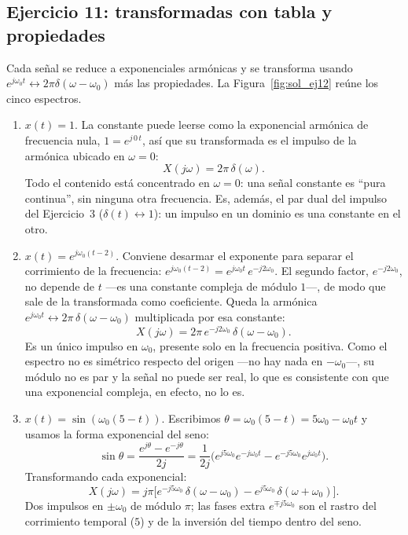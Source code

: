 \documentclass[10pt,a4paper]{article}
\begin{document}
	\subsection*{Ejercicio 11: transformadas con tabla y propiedades}

	Cada señal se reduce a exponenciales armónicas y se transforma usando $e^{j\omega_0 t}\leftrightarrow 2\pi\delta(\omega-\omega_0)$ más las propiedades. La Figura~\ref{fig:sol_ej12} reúne los cinco espectros.

	\begin{enumerate}[label=\textbf{\alph*)}]
		\item $x(t)=1$. La constante puede leerse como la exponencial armónica de frecuencia nula, $1=e^{j\,0\,t}$, así que su transformada es el impulso de la armónica ubicado en $\omega=0$:
		\[
			\boxed{X(j\omega)=2\pi\,\delta(\omega).}
		\]
		Todo el contenido está concentrado en $\omega=0$: una señal constante es ``pura continua'', sin ninguna otra frecuencia. Es, además, el par dual del impulso del Ejercicio~3 ($\delta(t)\leftrightarrow 1$): un impulso en un dominio es una constante en el otro.

		\item $x(t)=e^{j\omega_0(t-2)}$. Conviene desarmar el exponente para separar el corrimiento de la frecuencia: $e^{j\omega_0(t-2)}=e^{j\omega_0 t}\,e^{-j2\omega_0}$. El segundo factor, $e^{-j2\omega_0}$, no depende de $t$ ---es una constante compleja de módulo $1$---, de modo que sale de la transformada como coeficiente. Queda la armónica $e^{j\omega_0 t}\leftrightarrow 2\pi\,\delta(\omega-\omega_0)$ multiplicada por esa constante:
		\[
			\boxed{X(j\omega)=2\pi\,e^{-j2\omega_0}\,\delta(\omega-\omega_0).}
		\]
		Es un único impulso en $\omega_0$, presente solo en la frecuencia positiva. Como el espectro no es simétrico respecto del origen ---no hay nada en $-\omega_0$---, su módulo no es par y la señal no puede ser real, lo que es consistente con que una exponencial compleja, en efecto, no lo es.

		\item $x(t)=\sin(\omega_0(5-t))$. Escribimos $\theta=\omega_0(5-t)=5\omega_0-\omega_0 t$ y usamos la forma exponencial del seno:
		\[
			\sin\theta = \frac{e^{j\theta}-e^{-j\theta}}{2j}
			= \frac{1}{2j}\Big(e^{j5\omega_0}e^{-j\omega_0 t} - e^{-j5\omega_0}e^{j\omega_0 t}\Big).
		\]
		Transformando cada exponencial:
		\[
			\boxed{X(j\omega)=j\pi\Big[e^{-j5\omega_0}\,\delta(\omega-\omega_0) - e^{j5\omega_0}\,\delta(\omega+\omega_0)\Big].}
		\]
		Dos impulsos en $\pm\omega_0$ de módulo $\pi$; las fases extra $e^{\mp j5\omega_0}$ son el rastro del corrimiento temporal ($5$) y de la inversión del tiempo dentro del seno.


\end{enumerate}
\end{document}
